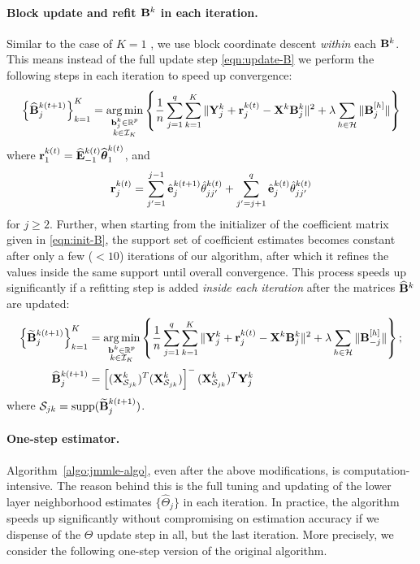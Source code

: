 \paragraph{Block update and refit ${\mathbf{B}}^k$ in each iteration.} Similar to the case of $K=1$ \citep{LinEtal16}, we use block coordinate descent {\it within} each ${\mathbf{B}}^k$. This means instead of the full update step \eqref{eqn:update-B} we perform the following steps in each iteration to speed up convergence:
%
$$
\left\{\widehat {{\mathbf{B}}}^{k (t+1)}_j \right\}_{k=1}^K =
\operatorname*{arg\,min}_{\substack{{\bf{b}}_j^k \in {\mathbb{R}}^p\\k \in {\cal{I}}_K}} \left\{ \frac{1}{n} \sum_{j=1}^q \sum_{k=1}^K \| {\mathbf{Y}}^k_j + {\bf{r}}_j^{k (t)} - {\mathbf{X}}^k {\mathbf{B}}_j^{k } \|^2
+ \lambda \sum_{h \in {\cal{H}}} \| {\mathbf{B}}_j^{[h]} \| \right\}
$$
%
where ${\bf{r}}_1^{k (t)} = \widehat {{\mathbf{E}}}_{-1}^{k (t)} \widehat {{\boldsymbol{\theta}}}_1^{k (t)}$, and
%
$$
{\bf{r}}_j^{k (t)} = \sum_{j'=1}^{j-1} \hat {{\bf{e}}}_j^{k (t+1)} \hat \theta_{jj'}^{k (t)} +
\sum_{j'=j+1}^{q} \hat {{\bf{e}}}_j^{k (t)} \hat \theta_{jj'}^{k (t)}
$$
%
for $j \geq 2$. Further, when starting from the initializer of the coefficient matrix given in \eqref{eqn:init-B}, the support set of coefficient estimates becomes constant after only a few ($< 10$) iterations of our algorithm, after which it refines the values inside the same support until overall convergence. This process speeds up significantly if a refitting step is added {\it inside each iteration} after the matrices $\widehat {{\mathbf{B}}}^k$ are updated:
%
\begin{align*}
\left\{\widetilde {{\mathbf{B}}}^{k (t+1)}_j \right\}_{k=1}^K &=
\operatorname*{arg\,min}_{\substack{{\bf{b}}^k \in {\mathbb{R}}^p\\k \in {\cal{I}}_K}} \left\{ \frac{1}{n} \sum_{j=1}^q \sum_{k=1}^K \| {\mathbf{Y}}^k_j + {\bf{r}}_j^{k (t)} - {\mathbf{X}}^k {\mathbf{B}}_j^{k } \|^2
+ \lambda \sum_{h \in {\cal{H}}} \| {\mathbf{B}}^{[h]}_{-j} \| \right\}; \\
\widehat {{\mathbf{B}}}^{k (t+1)}_j &= \left[ ({\mathbf{X}}_{{\cal{S}}_{jk}}^k)^T ({\mathbf{X}}_{{\cal{S}}_{jk}}^k) \right]^- ({\mathbf{X}}_{{\cal{S}}_{jk}}^k)^T {\mathbf{Y}}_j^k
\end{align*}
%
where ${\cal{S}}_{jk} = \operatorname*{supp}(\widetilde {{\mathbf{B}}}^{k (t+1)}_j)$.

\paragraph{One-step estimator.} Algorithm~\ref{algo:jmmle-algo}, even after the above modifications, is computation-intensive. The reason behind this is the full tuning and updating of the lower layer neighborhood estimates $\{ \widehat \Theta_j \}$ in each iteration. In practice, the algorithm speeds up significantly without compromising on estimation accuracy if we dispense of the $\Theta$ update step in all, but the last iteration. More precisely, we consider the following one-step version of the original algorithm.

